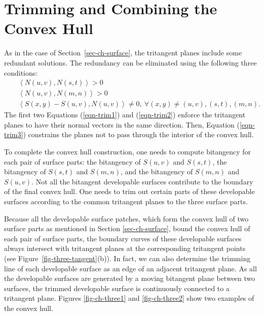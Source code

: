 \documentclass[11pt]{article}          %
\newcommand{\inner}[2]{\left<{#1}, {#2} \right>}
\begin{document}
\section{Trimming and Combining the Convex Hull}
\label{sec-trim-combine}

As in the case of Section~\ref{sec-ch-surface}, the tritangent planes
include some redundant solutions.
The redundancy can be eliminated using the following three conditions:
\begin{eqnarray}
& & \inner{N(u,v)}{N(s,t)} > 0 \label{eqn-trim1} \\
& & \inner{N(u,v)}{N(m,n)} > 0 \label{eqn-trim2} \\
& & \inner{S(x,y) - S(u,v)}{N(u,v)} \neq 0,\ 
\forall (x,y) \neq (u,v), (s,t), (m,n). \label{eqn-trim3}
\end{eqnarray}
The first two Equations (\ref{eqn-trim1}) and (\ref{eqn-trim2}) enforce 
the tritangent planes to have their normal vectors in the same direction. 
Then, Equation (\ref{eqn-trim3}) constrains the planes
not to pass through the interior of the convex hull.

To complete the convex hull construction, one needs to compute 
bitangency for each pair of surface parts: the bitangency of $S(u,v)$ and 
$S(s,t)$, the bitangency of $S(s,t)$ and $S(m,n)$, and the bitangency
of $S(m,n)$ and $S(u,v)$. Not all the bitangent developable surfaces
contribute to the boundary of the final convex hull. One needs to trim out
certain parts of these developable surfaces according to
the common tritangent planes to the three surface parts.

Because all the developable surface patches, which form the convex hull of 
two surface parts as mentioned in Section \ref{sec-ch-surface}, bound
the convex hull of each pair of surface parts, the boundary curves of these 
developable surfaces always intersect with tritangent planes
at the corresponding tritangent points (see Figure~\ref{fig-three-tangent}(b)).
In fact, we can also determine the trimming line of each developable surface
as an edge of an adjacent tritangent plane.
As all the developable surfaces are generated by a moving bitangent plane 
between two surfaces, the trimmed developable surface is continuously 
connected to a tritangent plane.
Figures \ref{fig-ch-three1} and \ref{fig-ch-three2} show
two examples of the convex hull.
\end{document}

